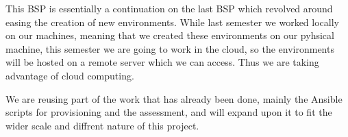 %
%
%

This BSP is essentially a continuation on the last BSP which revolved
around easing the creation of new environments. While last semester we
worked locally on our machines, meaning that we created these
environments on our pyhsical machine, this semester we are going to
work in the cloud, so the environments will be hosted on a remote
server which we can access. Thus we are taking advantage of cloud
computing.

We are reusing part of the work that has already been done, mainly the
Ansible scripts for provisioning and the assessment, and will expand
upon it to fit the wider scale and diffrent nature of this project.
